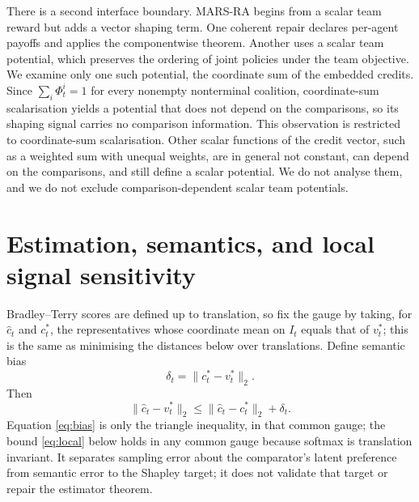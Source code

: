 \documentclass{article}
\begin{document}
There is a second interface boundary. MARS-RA begins from a scalar team reward but adds a vector shaping term. One coherent repair declares per-agent payoffs and applies the componentwise theorem. Another uses a scalar team potential, which preserves the ordering of joint policies under the team objective. We examine only one such potential, the coordinate sum of the embedded credits. Since \(\sum_i\Phi_t^i=1\) for every nonempty nonterminal coalition, coordinate-sum scalarisation yields a potential that does not depend on the comparisons, so its shaping signal carries no comparison information.
This observation is restricted to coordinate-sum scalarisation. Other scalar functions of the credit vector, such as a weighted sum with unequal weights, are in general not constant, can depend on the comparisons, and still define a scalar potential. We do not analyse them, and we do not exclude comparison-dependent scalar team potentials.

\section{Estimation, semantics, and local signal sensitivity}

Bradley--Terry scores are defined up to translation, so fix the gauge by taking, for \(\widehat c_t\) and \(c_t^*\), the representatives whose coordinate mean on \(I_t\) equals that of \(v_t^*\); this is the same as minimising the distances below over translations. Define semantic bias
\begin{equation}
 \delta_t=\lVert c_t^*-v_t^*\rVert_2 .
\end{equation}
Then
\begin{equation}
 \lVert\widehat c_t-v_t^*\rVert_2
 \leq \lVert\widehat c_t-c_t^*\rVert_2+\delta_t.
 \label{eq:bias}
\end{equation}
Equation \eqref{eq:bias} is only the triangle inequality, in that common gauge; the bound \eqref{eq:local} below holds in any common gauge because softmax is translation invariant. It separates sampling error about the comparator's latent preference from semantic error to the Shapley target; it does not validate that target or repair the estimator theorem.
\end{document}

